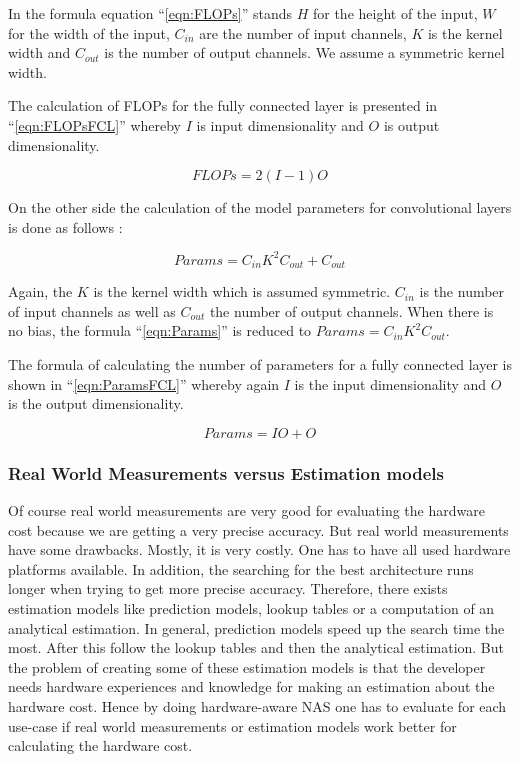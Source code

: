 \documentclass[conference]{IEEEtran}
\begin{document}
In the formula equation ``\eqref{eqn:FLOPs}'' stands $H$ for the height of the input, $W$ for the width of the input, $C_{in}$ are the number of input channels, $K$ is the kernel width and $C_{out}$ is the number of output channels. We assume a symmetric kernel width. 

The calculation of FLOPs for the fully connected layer is presented in ``\eqref{eqn:FLOPsFCL}'' whereby $I$ is input dimensionality and $O$ is output dimensionality. 

\begin{equation}
\label{eqn:FLOPsFCL}
FLOPs = 2(I-1)O
\end{equation} 

On the other side the calculation of the model parameters for convolutional layers is done as follows \cite{bib6}:

\begin{equation}
\label{eqn:Params}
Params = C_{in}K^{2}C_{out}+C_{out}
\end{equation} 

Again, the $K$ is the kernel width which is assumed symmetric. $C_{in}$ is the number of input channels as well as $C_{out}$ the number of output channels. When there is no bias, the formula ``\eqref{eqn:Params}'' is reduced to $Params = C_{in}K^{2}C_{out}$. 

The formula of calculating the number of parameters for a fully connected layer is shown in ``\eqref{eqn:ParamsFCL}'' whereby again $I$ is the input dimensionality and $O$ is the output dimensionality. 

\begin{equation}
\label{eqn:ParamsFCL}
Params = IO+O
\end{equation}  


\subsubsection{Real World Measurements versus Estimation models}

Of course real world measurements are very good for evaluating the hardware cost because we are getting a very precise accuracy. But real world measurements have some drawbacks. Mostly, it is very costly. One has to have all used hardware platforms available. In addition, the searching for the best architecture runs longer when trying to get more precise accuracy. Therefore, there exists estimation models like prediction models, lookup tables or a computation of an analytical estimation. In general, prediction models speed up the search time the most. After this follow the lookup tables and then the analytical estimation. But the problem of creating some of these estimation models is that the developer needs hardware experiences and knowledge for making an estimation about the hardware cost. Hence by doing hardware-aware NAS one has to evaluate for each use-case if real world measurements or estimation models work better for calculating the hardware cost. 
\end{document}
